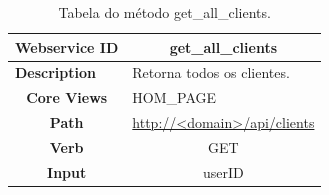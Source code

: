 \begin{titlepage}
\begin{table}[H]
\begin{tabular}{|c|l|}
\end{tabular}
\end{table}

\begin{table}[H]
\centering
\caption{Tabela do método get\_all\_clients.}
\label{my-label}
\begin{tabular}{|c|l|}
\hline 
\textbf{Webservice ID}                     & \multicolumn{1}{c|}{get\_all\_clients}                                                                                                                                                                                        \\ \hline
\multicolumn{1}{|l|}{\textbf{Description}} & Retorna todos os clientes.                                                                                                                                                                                    \\ \hline
\textbf{Core Views}                        & HOM\_PAGE                                                                                                                                                                                                                          \\ \hline
\textbf{Path}                              & \url{http://<domain>/api/clients}                                                                                                                                                          \\ \hline
\textbf{Verb}                              & \multicolumn{1}{c|}{GET}                                                                                                                                                                                                \\ \hline
\textbf{Input}                             & \multicolumn{1}{c|}{userID}                                                                                                                                                                                           \\ \hline

\end{tabular}
\end{table}
\end{titlepage}
